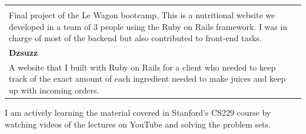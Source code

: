 \documentclass{article}
\begin{document}
\begin{tabular}{l l}
\begin{minipage}{120mm}
        \noindent
        \textbf{Nutri} \\
        Final project of the Le Wagon bootcamp. This is a nutritional website we developed in a team of 3 people using the Ruby on Rails framework. I was in charge of most of the backend but also contributed to front-end tasks.
        \smallskip \\

        \noindent
        \textbf{Dzsuzz} \\
        A website that I built with Ruby on Rails for a client who needed to keep track of the exact amount of each ingredient needed to make juices and keep up with incoming orders. 
    \end{minipage}
\end{tabular}

\vspace{5mm}
\noindent
I am actively learning the material covered in Stanford's CS229 course by watching videos of the lectures on YouTube and solving the problem sets.
\end{document}
